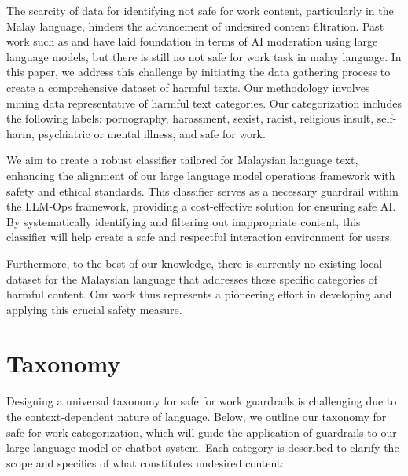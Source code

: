\documentclass[preprint]{article}
\begin{document}
The scarcity of data for identifying not safe for work content, particularly in the Malay language, hinders the advancement of undesired content filtration. Past work such as and  have laid foundation in terms of AI moderation using large language models, but there is still no not safe for work task in malay language. In this paper, we address this challenge by initiating the data gathering process to create a comprehensive dataset of harmful texts. Our methodology involves mining data representative of harmful text categories. Our categorization includes the following labels: pornography, harassment, sexist, racist, religious insult, self-harm, psychiatric or mental illness, and safe for work.

We aim to create a robust classifier tailored for Malaysian language text, enhancing the alignment of our large language model operations framework with safety and ethical standards. This classifier serves as a necessary guardrail within the LLM-Ops framework, providing a cost-effective solution for ensuring safe AI. By systematically identifying and filtering out inappropriate content, this classifier will help create a safe and respectful interaction environment for users.

Furthermore, to the best of our knowledge, there is currently no existing local dataset for the Malaysian language that addresses these specific categories of harmful content. Our work thus represents a pioneering effort in developing and applying this crucial safety measure.

\section{Taxonomy}

Designing a universal taxonomy for safe for work guardrails is challenging due to the context-dependent nature of language. Below, we outline our taxonomy for safe-for-work categorization, which will guide the application of guardrails to our large language model or chatbot system. Each category is described to clarify the scope and specifics of what constitutes undesired content:
\end{document}
